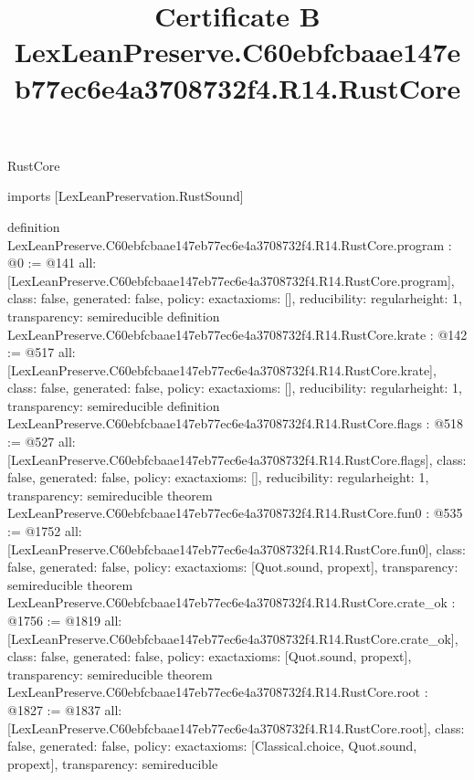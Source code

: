 \begin{lexlean}{RustCore}
\title{Certificate B LexLeanPreserve.C60ebfcbaae147eb77ec6e4a3708732f4.R14.RustCore}
\begin{coremodule}
imports [LexLeanPreservation.RustSound]

definition LexLeanPreserve.C60ebfcbaae147eb77ec6e4a3708732f4.R14.RustCore.program : @0 := @141 {
  all: [LexLeanPreserve.C60ebfcbaae147eb77ec6e4a3708732f4.R14.RustCore.program],
  class: false,
  generated: false,
  policy: exact{axioms: []},
  reducibility: regular{height: 1},
  transparency: semireducible
}
definition LexLeanPreserve.C60ebfcbaae147eb77ec6e4a3708732f4.R14.RustCore.krate : @142 := @517 {
  all: [LexLeanPreserve.C60ebfcbaae147eb77ec6e4a3708732f4.R14.RustCore.krate],
  class: false,
  generated: false,
  policy: exact{axioms: []},
  reducibility: regular{height: 1},
  transparency: semireducible
}
definition LexLeanPreserve.C60ebfcbaae147eb77ec6e4a3708732f4.R14.RustCore.flags : @518 := @527 {
  all: [LexLeanPreserve.C60ebfcbaae147eb77ec6e4a3708732f4.R14.RustCore.flags],
  class: false,
  generated: false,
  policy: exact{axioms: []},
  reducibility: regular{height: 1},
  transparency: semireducible
}
theorem LexLeanPreserve.C60ebfcbaae147eb77ec6e4a3708732f4.R14.RustCore.fun0 : @535 := @1752 {
  all: [LexLeanPreserve.C60ebfcbaae147eb77ec6e4a3708732f4.R14.RustCore.fun0],
  class: false,
  generated: false,
  policy: exact{axioms: [Quot.sound, propext]},
  transparency: semireducible
}
theorem LexLeanPreserve.C60ebfcbaae147eb77ec6e4a3708732f4.R14.RustCore.crate_ok : @1756 := @1819 {
  all: [LexLeanPreserve.C60ebfcbaae147eb77ec6e4a3708732f4.R14.RustCore.crate_ok],
  class: false,
  generated: false,
  policy: exact{axioms: [Quot.sound, propext]},
  transparency: semireducible
}
theorem LexLeanPreserve.C60ebfcbaae147eb77ec6e4a3708732f4.R14.RustCore.root : @1827 := @1837 {
  all: [LexLeanPreserve.C60ebfcbaae147eb77ec6e4a3708732f4.R14.RustCore.root],
  class: false,
  generated: false,
  policy: exact{axioms: [Classical.choice, Quot.sound, propext]},
  transparency: semireducible
}


\end{coremodule}
\end{lexlean}
